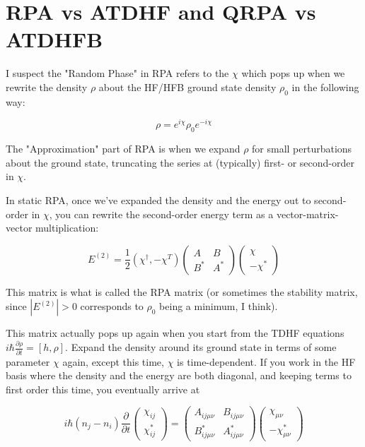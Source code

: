\chapter{RPA vs ATDHF and QRPA vs ATDHFB}

I suspect the "Random Phase" in RPA refers to the $\chi$ which pops up when we rewrite the density $\rho$ about the HF/HFB ground state density $\rho_0$ in the following way:

\begin{equation}
\rho = e^{i\chi} \rho_0 e^{-i\chi}
\end{equation}

\noindent The "Approximation" part of RPA is when we expand $\rho$ for small perturbations about the ground state, truncating the series at (typically) first- or second-order in $\chi$.

In static RPA, once we've expanded the density and the energy out to second-order in $\chi$, you can rewrite the second-order energy term as a vector-matrix-vector multiplication:

\begin{equation}
E^{(2)} = \frac{1}{2}\left(\chi^\dagger, -\chi^T\right) \left(\begin{array}{cc}
A & B \\
B^* & A^*
\end{array}\right) \left(\begin{array}{c}
\chi \\
-\chi^*
\end{array}\right)
\end{equation}

\noindent This matrix is what is called the RPA matrix (or sometimes the stability matrix, since $|E^{(2)}|>0$ corresponds to $\rho_0$ being a minimum, I think).

This matrix actually pops up again when you start from the TDHF equations $i\hbar\frac{\partial\rho}{\partial t} = [h, \rho]$. Expand the density around its ground state in terms of some parameter $\chi$ again, except this time, $\chi$ is time-dependent. If you work in the HF basis where the density and the energy are both diagonal, and keeping terms to first order this time, you eventually arrive at

\begin{equation}
i\hbar(n_j-n_i)\frac{\partial}{\partial t}\left(\begin{array}{c}
\chi_{ij} \\
\chi_{ij}^*
\end{array}\right) = \left(\begin{array}{cc}
A_{ij\mu\nu} & B_{ij\mu\nu} \\
B^*_{ij\mu\nu} & A^*_{ij\mu\nu}
\end{array}\right) \left(\begin{array}{c}
\chi_{\mu\nu} \\
-\chi^*_{\mu\nu}
\end{array}\right)
\end{equation}


